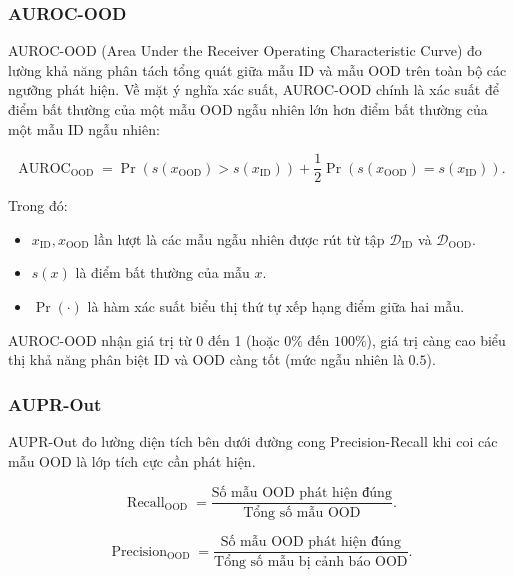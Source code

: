 \subsubsection{AUROC-OOD}

AUROC-OOD \cite{Hendrycks2017MSP} (Area Under the Receiver Operating Characteristic Curve) đo lường khả năng phân tách tổng quát giữa mẫu ID và mẫu OOD trên toàn bộ các ngưỡng phát hiện. Về mặt ý nghĩa xác suất, AUROC-OOD chính là xác suất để điểm bất thường của một mẫu OOD ngẫu nhiên lớn hơn điểm bất thường của một mẫu ID ngẫu nhiên:

\begin{equation}
    \operatorname{AUROC}_{\mathrm{OOD}} = \Pr\left(s(x_{\mathrm{OOD}}) > s(x_{\mathrm{ID}})\right) + \frac{1}{2}\Pr\left(s(x_{\mathrm{OOD}}) = s(x_{\mathrm{ID}})\right).
    \label{eq:ch4_auroc_ood}
\end{equation}

Trong đó:
\begin{itemize}
    \item $x_{\mathrm{ID}}, x_{\mathrm{OOD}}$ lần lượt là các mẫu ngẫu nhiên được rút từ tập $\mathcal{D}_{\mathrm{ID}}$ và $\mathcal{D}_{\mathrm{OOD}}$.
    \item $s(x)$ là điểm bất thường của mẫu $x$.
    \item $\Pr(\cdot)$ là hàm xác suất biểu thị thứ tự xếp hạng điểm giữa hai mẫu.
\end{itemize}

AUROC-OOD nhận giá trị từ 0 đến 1 (hoặc $0\%$ đến $100\%$), giá trị càng cao biểu thị khả năng phân biệt ID và OOD càng tốt (mức ngẫu nhiên là $0.5$).

\subsubsection{AUPR-Out}

AUPR-Out \cite{Hendrycks2017MSP,Liang2018ODIN} đo lường diện tích bên dưới đường cong Precision-Recall khi coi các mẫu OOD là lớp tích cực cần phát hiện.

\begin{equation}
    \operatorname{Recall}_{\mathrm{OOD}} = \frac{\text{Số mẫu OOD phát hiện đúng}}{\text{Tổng số mẫu OOD}}.
\end{equation}

\begin{equation}
    \operatorname{Precision}_{\mathrm{OOD}} = \frac{\text{Số mẫu OOD phát hiện đúng}}{\text{Tổng số mẫu bị cảnh báo OOD}}.
\end{equation}

